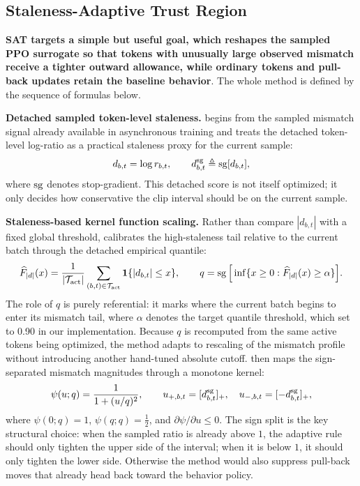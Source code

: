 \subsection{Staleness-Adaptive Trust Region}
\label{sec:satr-method}



\textbf{{SAT targets a simple but useful goal, which reshapes the sampled PPO surrogate so that tokens with unusually large observed mismatch receive a tighter outward allowance, while ordinary tokens and pull-back updates retain the baseline behavior}}. The whole method is defined by the sequence of formulas below.

\textbf{Detached sampled token-level staleness.} \satr{} begins from the sampled mismatch signal already available in asynchronous training and treats the detached token-level log-ratio as a practical staleness proxy for the current sample:
\begin{equation}
d_{b,t}=\log r_{b,t},\qquad d^{\mathrm{sg}}_{b,t}\triangleq\operatorname{sg}[d_{b,t}],
\label{eq:satr-d}
\end{equation}
where $\operatorname{sg}$ denotes stop-gradient. This detached score is not itself optimized; it only decides how conservative the clip interval should be on the current sample.

\textbf{Staleness-based kernel function scaling.} Rather than compare $|d_{b,t}|$ with a fixed global threshold, \satr{} calibrates the high-staleness tail relative to the current batch through the detached empirical quantile:
\begin{equation}
\widehat F_{|d|}(x)=\frac{1}{|\mathcal T_{\mathrm{act}}|}\sum_{(b,t)\in\mathcal T_{\mathrm{act}}}\mathbf 1\{|d_{b,t}|\le x\},
\qquad
q=\operatorname{sg}\Big[\inf\{x\ge 0:\widehat F_{|d|}(x)\ge \alpha\}\Big].
\label{eq:quantile}
\end{equation}
The role of $q$ is purely referential: it marks where the current batch begins to enter its mismatch tail, where $\alpha$ denotes the target quantile threshold, which set to 0.90 in our implementation. Because $q$ is recomputed from the same active tokens being optimized, the method adapts to rescaling of the mismatch profile without introducing another hand-tuned absolute cutoff.
\satr{} then maps the sign-separated mismatch magnitudes through a monotone kernel:
\begin{equation}
\psi(u;q)=\frac{1}{1+(u/q)^{2}},
\qquad
u_{+,b,t}=[d^{\mathrm{sg}}_{b,t}]_{+},\quad u_{-,b,t}=[-d^{\mathrm{sg}}_{b,t}]_{+},
\label{eq:kernel}
\end{equation}
where $\psi(0;q)=1$, $\psi(q;q)=\tfrac12$, and $\partial\psi/\partial u\le 0$. The sign split is the key structural choice: when the sampled ratio is already above $1$, the adaptive rule should only tighten the upper side of the interval; when it is below $1$, it should only tighten the lower side. Otherwise the method would also suppress pull-back moves that already head back toward the behavior policy.

